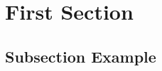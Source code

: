 \documentclass{beamer}
\begin{document}
% 
% 
% 
% 
% 
% 
% 
% 
% 
% 
% 
% 
% 
% 
%
% 
% 
% 
% 
% 
% 





\section{First Section} %

\subsection{Subsection Example} %
\end{document}
